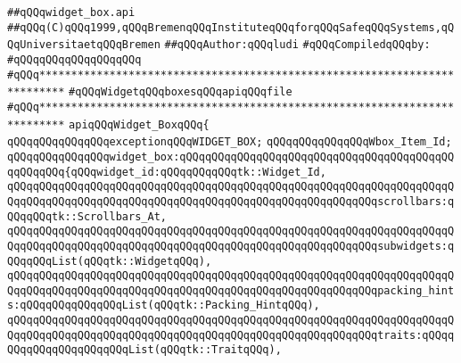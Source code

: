 \label{src/lib/tk/src/toolkit/widget_box.api}
\verb|##qQQqwidget_box.api|\newline
\verb|##qQQq(C)qQQq1999,qQQqBremenqQQqInstituteqQQqforqQQqSafeqQQqSystems,qQQqUniversitaetqQQqBremen|\newline
\verb|##qQQqAuthor:qQQqludi|\newline
\newline
\verb|#qQQqCompiledqQQqby:|\newline
\verb|#qQQqqQQqqQQqqQQqqQQq|\newline
\newline
\newline
\newline
\verb|#qQQq**************************************************************************|\newline
\verb|#qQQqWidgetqQQqboxesqQQqapiqQQqfile|\newline
\verb|#qQQq**************************************************************************|\newline
\newline
\verb|apiqQQqWidget_BoxqQQq{|\newline
\newline
\verb|qQQqqQQqqQQqqQQqexceptionqQQqWIDGET_BOX;|\newline
\newline
\verb|qQQqqQQqqQQqqQQqWbox_Item_Id;|\newline
\newline
\verb|qQQqqQQqqQQqqQQqwidget_box:qQQqqQQqqQQqqQQqqQQqqQQqqQQqqQQqqQQqqQQqqQQqqQQqqQQq{qQQqwidget_id:qQQqqQQqqQQqtk::Widget_Id,|\newline
\verb|qQQqqQQqqQQqqQQqqQQqqQQqqQQqqQQqqQQqqQQqqQQqqQQqqQQqqQQqqQQqqQQqqQQqqQQqqQQqqQQqqQQqqQQqqQQqqQQqqQQqqQQqqQQqqQQqqQQqqQQqqQQqqQQqscrollbars:qQQqqQQqtk::Scrollbars_At,|\newline
\verb|qQQqqQQqqQQqqQQqqQQqqQQqqQQqqQQqqQQqqQQqqQQqqQQqqQQqqQQqqQQqqQQqqQQqqQQqqQQqqQQqqQQqqQQqqQQqqQQqqQQqqQQqqQQqqQQqqQQqqQQqqQQqqQQqsubwidgets:qQQqqQQqList(qQQqtk::WidgetqQQq),|\newline
\verb|qQQqqQQqqQQqqQQqqQQqqQQqqQQqqQQqqQQqqQQqqQQqqQQqqQQqqQQqqQQqqQQqqQQqqQQqqQQqqQQqqQQqqQQqqQQqqQQqqQQqqQQqqQQqqQQqqQQqqQQqqQQqqQQqpacking_hints:qQQqqQQqqQQqqQQqList(qQQqtk::Packing_HintqQQq),|\newline
\verb|qQQqqQQqqQQqqQQqqQQqqQQqqQQqqQQqqQQqqQQqqQQqqQQqqQQqqQQqqQQqqQQqqQQqqQQqqQQqqQQqqQQqqQQqqQQqqQQqqQQqqQQqqQQqqQQqqQQqqQQqqQQqqQQqtraits:qQQqqQQqqQQqqQQqqQQqqQQqList(qQQqtk::TraitqQQq),|\newline
